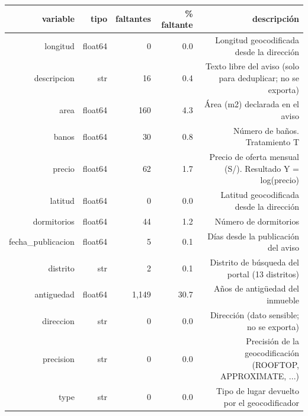 \begin{tabular}{rrrrr}
\toprule
variable & tipo & faltantes & \% faltante & descripción \\
\midrule
longitud & float64 & 0 & 0.0 & Longitud geocodificada desde la dirección \\
descripcion & str & 16 & 0.4 & Texto libre del aviso (solo para deduplicar; no se exporta) \\
area & float64 & 160 & 4.3 & Área (m2) declarada en el aviso \\
banos & float64 & 30 & 0.8 & Número de baños. Tratamiento T \\
precio & float64 & 62 & 1.7 & Precio de oferta mensual (S/). Resultado Y = log(precio) \\
latitud & float64 & 0 & 0.0 & Latitud geocodificada desde la dirección \\
dormitorios & float64 & 44 & 1.2 & Número de dormitorios \\
fecha\_publicacion & float64 & 5 & 0.1 & Días desde la publicación del aviso \\
distrito & str & 2 & 0.1 & Distrito de búsqueda del portal (13 distritos) \\
antiguedad & float64 & 1,149 & 30.7 & Años de antigüedad del inmueble \\
direccion & str & 0 & 0.0 & Dirección (dato sensible; no se exporta) \\
precision & str & 0 & 0.0 & Precisión de la geocodificación (ROOFTOP, APPROXIMATE, ...) \\
type & str & 0 & 0.0 & Tipo de lugar devuelto por el geocodificador \\
\bottomrule
\end{tabular}